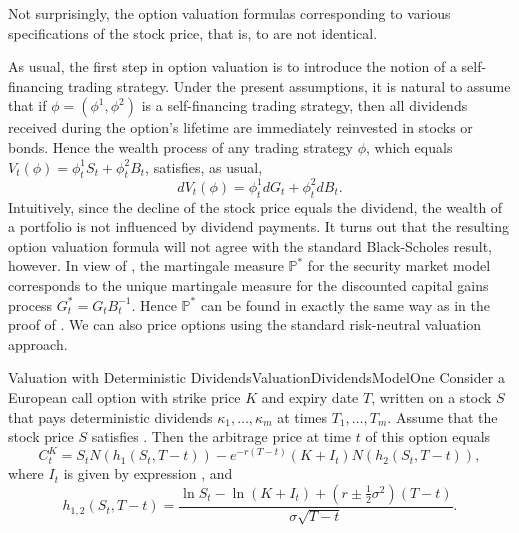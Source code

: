Not surprisingly, the option valuation formulas corresponding to various specifications of the stock price, that is, to  are not identical.

As usual, the first step in option valuation is to introduce the notion of a self-financing trading strategy. Under the present assumptions, it is natural to assume that if $\phi = (\phi^1, \phi^2)$ is a self-financing trading strategy, then all dividends received during the option's lifetime are immediately reinvested in stocks or bonds. Hence the wealth process of any trading strategy $\phi$, which equals $V_t(\phi) = \phi_t^1 S_t + \phi_t^2 B_t$, satisfies, as usual,
\begin{equation}
	dV_t(\phi) = \phi_t^1 dG_t + \phi_t^2 dB_t.
	\label{eq:WealthProcessDividends}
\end{equation}
Intuitively, since the decline of the stock price equals the dividend, the wealth of a portfolio is not influenced by dividend payments. It turns out that the resulting option valuation formula will not agree with the standard Black-Scholes result, however. In view of , the martingale measure $\mathbb{P}^*$ for the security market model corresponds to the unique martingale measure for the discounted capital gains process $G_t^* = G_t B_t^{-1}$. Hence $\mathbb{P}^*$ can be found in exactly the same way as in the proof of . We can also price options using the standard risk-neutral valuation approach.

\begin{prop}{Valuation with Deterministic Dividends}{ValuationDividendsModelOne}
	Consider a European call option with strike price $K$ and expiry date $T$, written on a stock $S$ that pays deterministic dividends $\kappa_1, \dots, \kappa_m$ at times $T_1, \dots, T_m$. Assume that the stock price $S$ satisfies . Then the arbitrage price at time $t$ of this option equals
	\begin{equation}
		C_t^K = S_t N(h_1(S_t, T-t)) - e^{-r(T-t)}(K + I_t)N(h_2(S_t, T-t)),
		\label{eq:CallPriceModelOne}
	\end{equation}
	where $I_t$ is given by expression , and
	\begin{equation}
		h_{1,2}(S_t, T-t) = \frac{\ln S_t - \ln(K + I_t) + (r \pm \frac{1}{2}\sigma^2)(T-t)}{\sigma\sqrt{T-t}}.
		\label{eq:d1d2ModelOne}
	\end{equation}
\end{prop}

